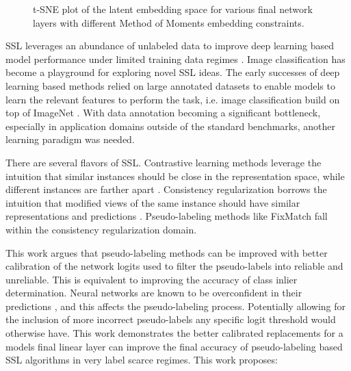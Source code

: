 \documentclass[10pt,twocolumn,letterpaper]{article}
\begin{document}
\begin{figure}[ht]
	\caption{t-SNE plot of the latent embedding space for various final network layers with different Method of Moments embedding constraints.} 
	\label{fig:schema}
\end{figure}

SSL leverages an abundance of unlabeled data to improve deep learning based model performance under limited training data regimes \cite{zhu2022introduction,li2019safe,hady2013semi}.
Image classification has become a playground for exploring novel SSL ideas.
The early successes of deep learning based methods relied on large annotated datasets to enable models to learn the relevant features to perform the task, i.e. image classification build on top of ImageNet \cite{deng2009imagenet}.
With data annotation becoming a significant bottleneck, especially in application domains outside of the standard benchmarks, another learning paradigm was needed.

There are several flavors of SSL.
Contrastive learning methods leverage the intuition that similar instances should be close in the representation space, while different instances are farther apart \cite{yang2022class,li2021comatch}.
Consistency regularization borrows the intuition that modified views of the same instance should have similar representations and predictions \cite{sohn2020fixmatch,lee2022contrastive,zhang2021flexmatch,kim2022conmatch}.
Pseudo-labeling methods like FixMatch \cite{sohn2020fixmatch} fall within the consistency regularization domain.

This work argues that pseudo-labeling methods can be improved with better calibration of the network logits used to filter the pseudo-labels into reliable and unreliable. 
This is equivalent to improving the accuracy of class inlier determination.
Neural networks are known to be overconfident in their predictions \cite{wei2022mitigating}, and this affects the pseudo-labeling process. 
Potentially allowing for the inclusion of more incorrect pseudo-labels any specific logit threshold would otherwise have.
This work demonstrates the better calibrated replacements for a models final linear layer can improve the final accuracy of pseudo-labeling based SSL algorithms in very label scarce regimes. 
This work proposes:
\end{document}

